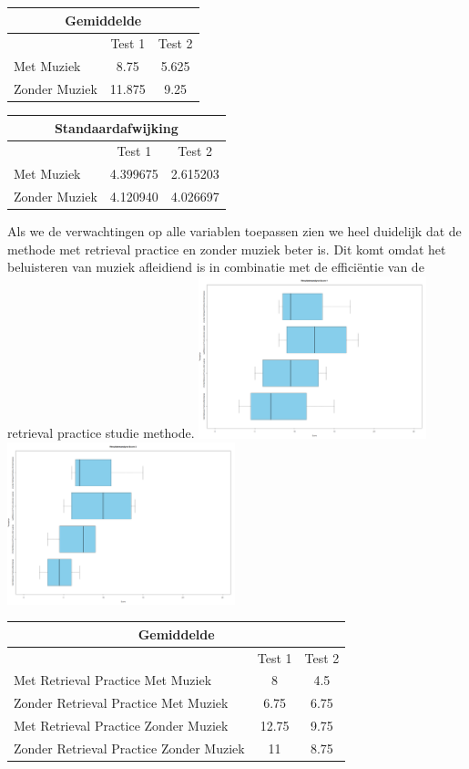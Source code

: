 \documentclass{hogent-article}
\begin{document}
	\begin{tabular}{ |p{10em}|c|c| }
	\hline
		\multicolumn{3}{|c|}{Gemiddelde} \\
	\hline
		& Test 1 & Test 2 \\
	\hline
		Met Muziek & 8.75  & 5.625 \\
		Zonder Muziek & 11.875 & 9.25 \\
	\hline
	\end{tabular}
	
	\begin{tabular}{ |p{10em}|c|c| }
	\hline
		\multicolumn{3}{|c|}{Standaardafwijking} \\
	\hline
		& Test 1 & Test 2 \\
	\hline
		Met Muziek & 4.399675  & 2.615203 \\
		Zonder Muziek & 4.120940 & 4.026697 \\
	\hline
	\end{tabular}
	
	Als we de verwachtingen op alle variablen toepassen zien we heel duidelijk dat de methode met retrieval practice en zonder muziek beter is. Dit komt omdat het beluisteren van muziek afleidiend is in combinatie met de efficiëntie van de retrieval practice studie methode. 
	\includegraphics[width=250px]{Verwacht_MuziekRT_Score1}
	\includegraphics[width=250px]{Verwacht_MuziekRT_Score2}
	\begin{tabular}{ |p{10em}|c|c| }
	\hline
		\multicolumn{3}{|c|}{Gemiddelde} \\
	\hline
		& Test 1 & Test 2 \\
	\hline
		Met Retrieval Practice Met Muziek  & 8 & 4.5 \\
	\hline
		Zonder Retrieval Practice Met Muziek & 6.75 & 6.75 \\
	\hline
		Met Retrieval Practice Zonder Muziek & 12.75  & 9.75 \\
	\hline
		Zonder Retrieval Practice Zonder Muziek & 11 & 8.75 \\
	\hline
	\end{tabular}
	
\end{document}
